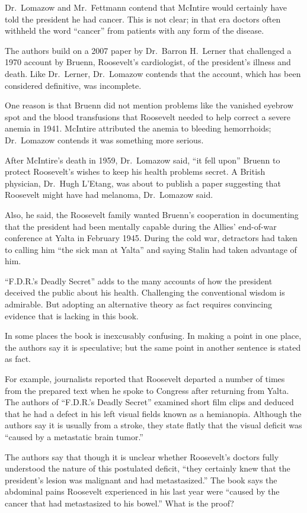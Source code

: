 ﻿\documentclass[12pt]{article}
\begin{document}
Dr.~Lomazow and Mr.~Fettmann contend that McIntire would certainly have told the president he had
cancer. This is not clear; in that era doctors often withheld the word ``cancer'' from patients with
any form of the disease.

The authors build on a 2007 paper by Dr.~Barron H.~Lerner that challenged a 1970 account by Bruenn,
Roosevelt's cardiologist, of the president's illness and death. Like Dr.~Lerner, Dr.~Lomazow
contends that the account, which has been considered definitive, was incomplete.

One reason is that Bruenn did not mention problems like the vanished eyebrow spot and the blood
transfusions that Roosevelt needed to help correct a severe anemia in 1941. McIntire attributed the
anemia to bleeding hemorrhoids; Dr.~Lomazow contends it was something more serious.

After McIntire's death in 1959, Dr.~Lomazow said, ``it fell upon'' Bruenn to protect Roosevelt's
wishes to keep his health problems secret. A British physician, Dr.~Hugh L'Etang, was about to
publish a paper suggesting that Roosevelt might have had melanoma, Dr.~Lomazow said.

Also, he said, the Roosevelt family wanted Bruenn's cooperation in documenting that the president
had been mentally capable during the Allies' end-of-war conference at Yalta in February 1945. During
the cold war, detractors had taken to calling him ``the sick man at Yalta'' and saying Stalin had
taken advantage of him.

``F.D.R.'s Deadly Secret'' adds to the many accounts of how the president deceived the public about
his health. Challenging the conventional wisdom is admirable. But adopting an alternative theory as
fact requires convincing evidence that is lacking in this book.

In some places the book is inexcusably confusing. In making a point in one place, the authors say it
is speculative; but the same point in another sentence is stated as fact.

For example, journalists reported that Roosevelt departed a number of times from the prepared text
when he spoke to Congress after returning from Yalta. The authors of ``F.D.R.'s Deadly Secret''
examined short film clips and deduced that he had a defect in his left visual fields known as a
hemianopia. Although the authors say it is usually from a stroke, they state flatly that the visual
deficit was ``caused by a metastatic brain tumor.''

The authors say that though it is unclear whether Roosevelt's doctors fully understood the nature of
this postulated deficit, ``they certainly knew that the president's lesion was malignant and had
metastasized.'' The book says the abdominal pains Roosevelt experienced in his last year were
``caused by the cancer that had metastasized to his bowel.'' What is the proof?
\end{document}

